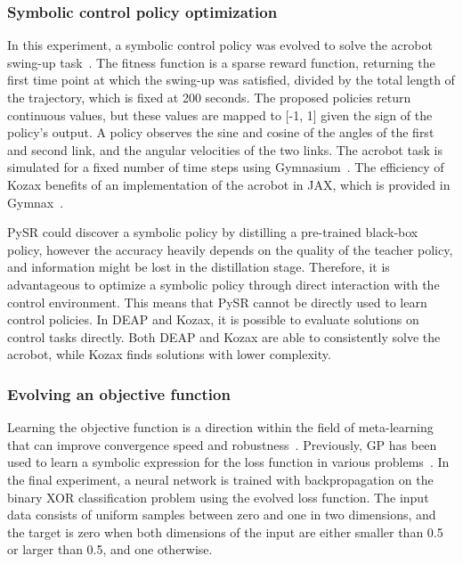 \documentclass{article}
\begin{document}
\subsubsection{Symbolic control policy optimization}
In this experiment, a symbolic control policy was evolved to solve the acrobot swing-up task~\cite{sutton1995generalization}. The fitness function is a sparse reward function, returning the first time point at which the swing-up was satisfied, divided by the total length of the trajectory, which is fixed at 200 seconds. The proposed policies return continuous values, but these values are mapped to [-1, 1] given the sign of the policy's output. A policy observes the sine and cosine of the angles of the first and second link, and the angular velocities of the two links. The acrobot task is simulated for a fixed number of time steps using Gymnasium~\cite{towers2024gymnasium}. The efficiency of Kozax benefits of an implementation of the acrobot in JAX, which is provided in Gymnax~\cite{gymnax2022github}.

PySR could discover a symbolic policy by distilling a pre-trained black-box policy, however the accuracy heavily depends on the quality of the teacher policy, and information might be lost in the distillation stage. Therefore, it is advantageous to optimize a symbolic policy through direct interaction with the control environment. This means that PySR cannot be directly used to learn control policies. In DEAP and Kozax, it is possible to evaluate solutions on control tasks directly. Both DEAP and Kozax are able to consistently solve the acrobot, while Kozax finds solutions with lower complexity.

\subsubsection{Evolving an objective function}\label{sec: loss}
Learning the objective function is a direction within the field of meta-learning that can improve convergence speed and robustness~\cite{bechtle2021meta}. Previously, GP has been used to learn a symbolic expression for the loss function in various problems~\cite{raymond2023fast}. In the final experiment, a neural network is trained with backpropagation on the binary XOR classification problem using the evolved loss function. The input data consists of uniform samples between zero and one in two dimensions, and the target is zero when both dimensions of the input are either smaller than 0.5 or larger than 0.5, and one otherwise.
\end{document}
